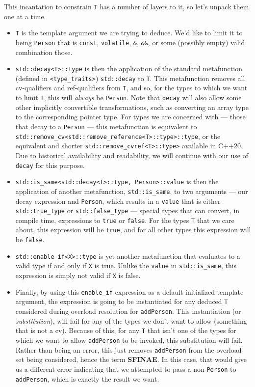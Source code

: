 \noindent This incantation to constrain \texttt{T} has a number of layers to it,
so let's unpack them one at a time.
\begin{itemize}
\item{\texttt{T} is the template argument we are trying to deduce. We’d like to limit it to being \texttt{Person} that is \texttt{const}, \texttt{volatile}, \texttt{\&}, \texttt{\&\&}, or some (possibly empty) valid combination those.}
\item{\texttt{std::decay<T>::type} is then the application of the standard metafunction (defined in \texttt{<type\_traits>}) \texttt{std::decay} to \texttt{T}. This metafunction removes all cv-qualifiers and ref-qualifiers from \texttt{T}, and so, for the types to which we want to limit \texttt{T}, this will \emph{always} be \texttt{Person}. Note that \texttt{decay} will also allow some other implicitly convertible transformations, such as converting an array type to the corresponding pointer type. For types we are concerned with --- those that decay to a \texttt{Person} --- this metafunction is equivalent to \texttt{std::remove\_cv<std::remove\_reference<T>::type>::type}, or the equivalent and shorter \texttt{std::remove\_cvref<T>::type>} available in C++20. Due to historical availability and readability, we will continue with our use of \texttt{decay} for this purpose.}
\item{\texttt{std::is\_same<std::decay<T>::type,}~\texttt{Person>::value} is then the application of another metafunction, \texttt{std::is\_same}, to two arguments --- our decay expression and \texttt{Person}, which results in a \texttt{value} that is either \texttt{std::true\_type} or \texttt{std::false\_type} --- special types that can convert, in compile time, expressions to \texttt{true} or \texttt{false}. For the types \texttt{T} that we care about, this expression will be \texttt{true}, and for all other types this expression will be \texttt{false}.}
\item{\texttt{std::enable\_if<X>::type} is yet another metafunction that evaluates to a valid type if and only if \texttt{X} is true. Unlike the \texttt{value} in \texttt{std::is\_same}, this expression is simply not valid if \texttt{X} is false.}
\item{Finally, by using this \texttt{enable\_if} expression as a default-initialized template argument, the expression is going to be instantiated for any deduced \texttt{T} considered during overload resolution for \texttt{addPerson}. This instantiation (or \textit{substitution}), will fail for any of the types we don’t want to allow (something that is not a cv). Because of this, for any \texttt{T} that isn’t one of the types for which we want to allow \texttt{addPerson} to be invoked, this substitution will fail. Rather than being an error, this just removes \texttt{addPerson} from the overload set being considered, hence the term \textbf{SFINAE}. In this case, that would give us a different error indicating that we attempted to pass a non-\texttt{Person} to \texttt{addPerson}, which is exactly the result we want.}
\end{itemize}
